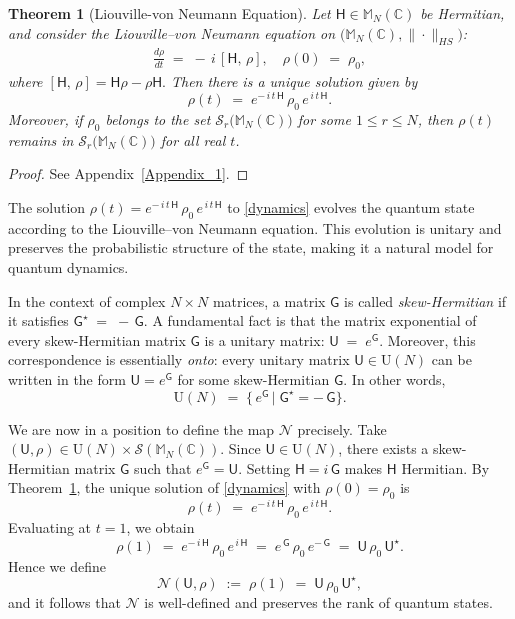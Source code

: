 \documentclass[a4paper,11pt]{article}
\newtheorem{theorem}{Theorem}[section]
\newcommand{\rH}{\mathsf{H}}
\newcommand{\rU}{\mathsf{U}}
\begin{document}
\begin{theorem}[Liouville-von Neumann Equation]\label{Liouville-vonNeumann}
Let \(\rH \in \mathbb{M}_N(\mathbb{C})\) be Hermitian, and consider the Liouville--von Neumann equation on 
\(\bigl(\mathbb{M}_N(\mathbb{C}),\|\cdot\|_{HS}\bigr)\):
\begin{align}\label{dynamics}
\frac{d\rho}{dt} \;=\; -\,i\,[\rH,\,\rho], \quad 
\rho(0) \;=\; \rho_0, 
\end{align}
where \([\rH,\,\rho] = \rH\rho - \rho\rH.\)
Then there is a unique solution given by
\[
\rho(t) \;=\; e^{-\,i\,t\,\rH}\,\rho_0\,e^{\,i\,t\,\rH}.
\]
Moreover, if \(\rho_0\) belongs to the set \(\mathcal{S}_r\bigl(\mathbb{M}_N(\mathbb{C})\bigr)\)
for some \(1 \le r \le N\), then \(\rho(t)\) remains in \(\mathcal{S}_r\bigl(\mathbb{M}_N(\mathbb{C})\bigr)\)
for all real \(t\).
\end{theorem}

\begin{proof}
See Appendix~\ref{Appendix_1}.
\end{proof}

\smallskip

The solution \(\rho(t) = e^{-\,i\,t\,\rH}\,\rho_0\,e^{\,i\,t\,\rH}\) to \eqref{dynamics} evolves the quantum state according to the Liouville--von Neumann equation. This evolution is unitary and preserves the probabilistic structure of the state, making it a natural model for quantum dynamics.

\bigskip

In the context of complex \(N \times N\) matrices, a matrix \(\mathsf{G}\) is called 
\emph{skew-Hermitian} if it satisfies
\(
\mathsf{G}^{\star} \;=\; -\,\mathsf{G}.
\) A fundamental fact is that the matrix exponential of
every skew-Hermitian matrix \(\mathsf{G}\) is  a 
unitary matrix:
\(\rU \;=\; e^{\mathsf{G}}.\) Moreover, this correspondence is essentially \emph{onto}: every unitary matrix \(\rU \in \mathrm{U}(N)\) 
can be written in the form \(\rU = e^{\mathsf{G}}\) for some skew-Hermitian \(\mathsf{G}\). In other words,
\[
\mathrm{U}(N) \;=\; 
\bigl\{\, e^{\mathsf{G}} \,\bigl|\; \mathsf{G}^{\star} = -\,\mathsf{G} \bigr\}.
\]

\bigskip

We are now in a position to define the map \(\mathcal{N}\) precisely. Take \((\rU, \rho) \in \mathrm{U}(N) \times \mathcal{S}(\mathbb{M}_N(\mathbb{C}))\). Since \(\rU \in \mathrm{U}(N)\), there exists a skew-Hermitian matrix \(\mathsf{G}\) such that \(e^{\mathsf{G}} = \rU.\) Setting \(\rH = i\,\mathsf{G}\) makes \(\rH\) Hermitian. By Theorem~\ref{Liouville-vonNeumann}, the unique solution of \eqref{dynamics} with \(\rho(0) = \rho_0\) is 
\[
\rho(t) \;=\; e^{-\,i\,t\,\rH}\,\rho_0\,e^{\,i\,t\,\rH}.
\]
Evaluating at \(t = 1\), we obtain
\[
\rho(1) \;=\; e^{-\,i\,\rH}\,\rho_0\,e^{\,i\,\rH}
\;=\;
e^{\,\mathsf{G}}\,\rho_0\,e^{-\,\mathsf{G}}
\;=\;
\rU \,\rho_0\, \rU^{\star}.
\]
Hence we define 
\[
\mathcal{N}(\rU,\rho) \;:=\; \rho(1) 
\;=\; \rU \,\rho_0\, \rU^{\star},
\]
and it follows that \(\mathcal{N}\) is well-defined and preserves the rank of quantum states.
\end{document}
